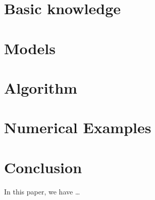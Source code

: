 \documentclass{svjour3}                     %
\begin{document}
\section{Basic knowledge}\label{sec:sec-2}



\section{Models}\label{sec:sec-3}



\section{Algorithm}\label{sec:sec-4}



\section{Numerical Examples}\label{sec:sec-5}



\section{Conclusion}\label{sec:sec-6}
In this paper, we have \dots
\end{document}
